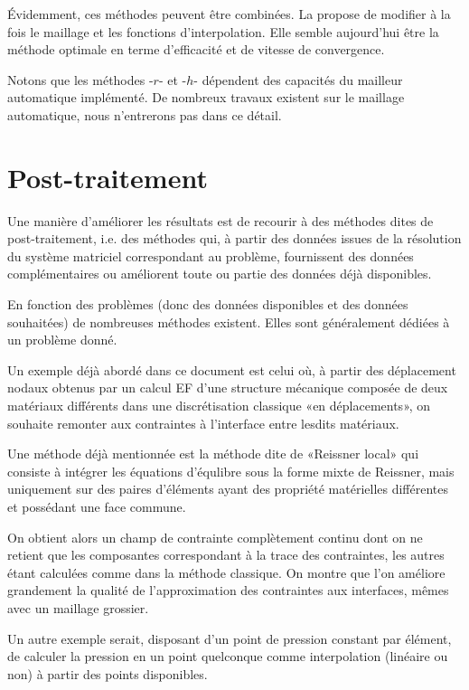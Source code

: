 \medskip
Évidemment, ces méthodes peuvent être combinées.
La  propose de modifier à la fois le maillage et
les fonctions d'interpolation. Elle semble aujourd'hui être la méthode optimale en terme
d'efficacité et de vitesse de convergence.

Notons que les méthodes -$r$- et -$h$- dépendent des capacités du mailleur automatique implémenté. De nombreux travaux existent sur le maillage automatique, nous n'entrerons pas dans ce détail.

\medskip
\section{Post-traitement}\label{Sec-PT}
Une manière d'améliorer les résultats est de recourir à des méthodes dites
de post-traitement, i.e. des méthodes qui, à partir des données issues de la
résolution du système matriciel correspondant au problème, fournissent
des données complémentaires ou améliorent toute ou partie des données
déjà disponibles.

En fonction des problèmes (donc des données disponibles et des données
souhaitées) de nombreuses méthodes existent. Elles sont généralement
dédiées à un problème donné.

\medskip
Un exemple déjà abordé dans ce document est celui où, à partir des déplacement
nodaux obtenus par un calcul EF d'une structure mécanique composée de deux matériaux
différents dans une discrétisation classique «en déplacements», on souhaite remonter
aux contraintes à l'interface entre lesdits matériaux.

Une méthode déjà mentionnée est la méthode dite de «Reissner local»
qui consiste à intégrer les équations d'équlibre sous la forme mixte de Reissner,
mais uniquement sur des paires d'éléments ayant des propriété matérielles différentes
et possédant une face commune.

On obtient alors un champ de contrainte complètement continu dont on ne retient que
les composantes correspondant à la trace des contraintes, les autres étant calculées
comme dans la méthode classique. On montre que l'on améliore grandement la qualité
de l'approximation des contraintes aux interfaces, mêmes avec un maillage grossier.

\medskip
Un autre exemple serait, disposant d'un point de pression constant par élément, de
calculer la pression en un point quelconque comme interpolation (linéaire ou non) à
partir des points disponibles.

